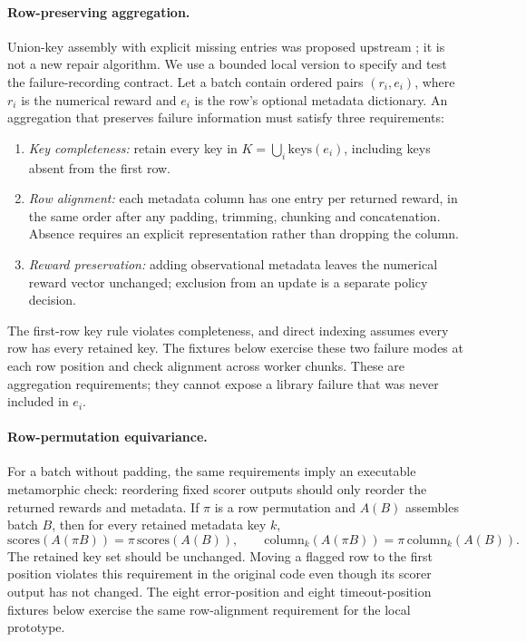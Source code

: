 \documentclass[10pt,a4paper]{article}
\let\cite\citep
\begin{document}
\paragraph{Row-preserving aggregation.}
Union-key assembly with explicit missing entries was proposed upstream
\cite{verl6545,verl7151}; it is not a new repair algorithm. We use a
bounded local version to specify and test the failure-recording contract.
Let a batch contain ordered pairs $(r_i,e_i)$, where $r_i$ is the numerical
reward and $e_i$ is the row's optional metadata dictionary. An aggregation
that preserves failure information must satisfy three requirements:
\begin{enumerate}[nosep,leftmargin=*]
\item \emph{Key completeness:} retain every key in
      $K=\bigcup_i \mathrm{keys}(e_i)$, including keys absent from the first row.
\item \emph{Row alignment:} each metadata column has one entry per returned
      reward, in the same order after any padding, trimming, chunking and
      concatenation. Absence
      requires an explicit representation rather than dropping the column.
\item \emph{Reward preservation:} adding observational metadata leaves
      the numerical reward vector unchanged; exclusion from an update is
      a separate policy decision.
\end{enumerate}
The first-row key rule violates completeness, and direct indexing assumes
every row has every retained key. The fixtures below exercise these two
failure modes at each row position and check alignment across worker
chunks. These are aggregation requirements; they cannot expose a library
failure that was never included in $e_i$.

\paragraph{Row-permutation equivariance.}
For a batch without padding, the same requirements imply an executable
metamorphic check: reordering fixed scorer outputs should only reorder
the returned rewards and metadata. If $\pi$ is a row permutation and
$A(B)$ assembles batch $B$, then for every retained metadata key $k$,
\[
 \mathrm{scores}(A(\pi B))=\pi\,\mathrm{scores}(A(B)),\qquad
 \mathrm{column}_k(A(\pi B))=\pi\,\mathrm{column}_k(A(B)).
\]
The retained key set should be unchanged. Moving a flagged row to the
first position violates this requirement in the original code even
though its scorer output has not changed. The eight error-position and
eight timeout-position fixtures below exercise the same row-alignment
requirement for the local prototype.
\end{document}
